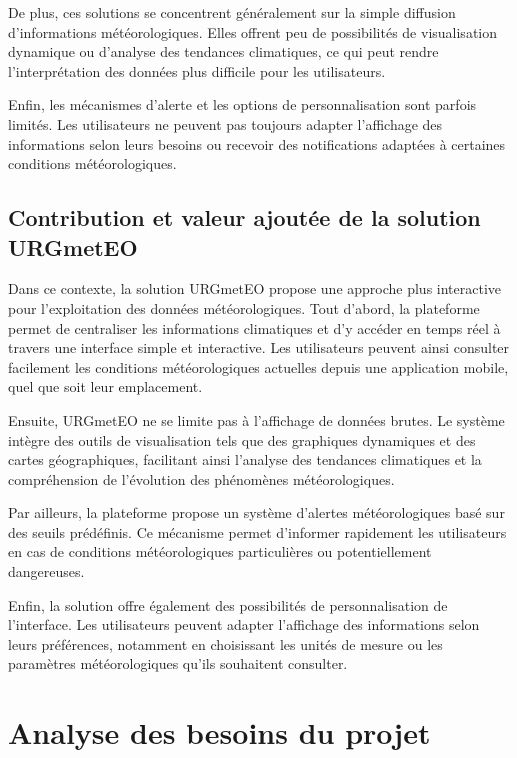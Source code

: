 \noident De plus, ces solutions se concentrent généralement sur la simple diffusion d’informations météorologiques. Elles offrent peu de possibilités de visualisation dynamique ou d’analyse des tendances climatiques, ce qui peut rendre l’interprétation des données plus difficile pour les utilisateurs.

\noident Enfin, les mécanismes d’alerte et les options de personnalisation sont parfois limités. Les utilisateurs ne peuvent pas toujours adapter l’affichage des informations selon leurs besoins ou recevoir des notifications adaptées à certaines conditions météorologiques.


\subsection{Contribution et valeur ajoutée de la solution URGmetEO}

Dans ce contexte, la solution URGmetEO propose une approche plus interactive pour l’exploitation des données météorologiques. Tout d’abord, la plateforme permet de centraliser les informations climatiques et d’y accéder en temps réel à travers une interface simple et interactive. Les utilisateurs peuvent ainsi consulter facilement les conditions météorologiques actuelles depuis une application mobile, quel que soit leur emplacement.

Ensuite, URGmetEO ne se limite pas à l’affichage de données brutes. Le système intègre des outils de visualisation tels que des graphiques dynamiques et des cartes géographiques, facilitant ainsi l’analyse des tendances climatiques et la compréhension de l’évolution des phénomènes météorologiques.

Par ailleurs, la plateforme propose un système d’alertes météorologiques basé sur des seuils prédéfinis. Ce mécanisme permet d’informer rapidement les utilisateurs en cas de conditions météorologiques particulières ou potentiellement dangereuses.

Enfin, la solution offre également des possibilités de personnalisation de l’interface. Les utilisateurs peuvent adapter l’affichage des informations selon leurs préférences, notamment en choisissant les unités de mesure ou les paramètres météorologiques qu’ils souhaitent consulter.


 \section{Analyse des besoins du projet}
 
